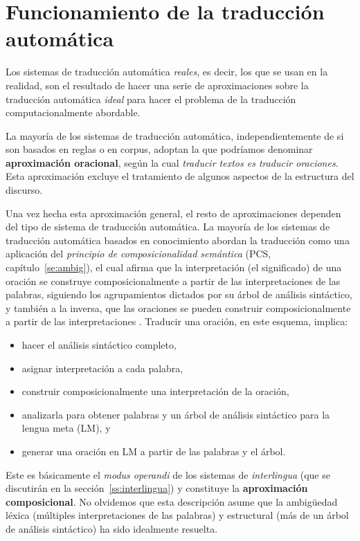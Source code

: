 \section{Funcionamiento de la traducción automática} \label{se:aprox} 

Los sistemas de traducción automática \emph{reales}, es decir, los que se usan en la realidad, son el resultado de hacer una serie de aproximaciones sobre la traducción automática \emph{ideal} para hacer el problema de la traducción computacionalmente abordable. 

La mayoría de los sistemas de traducción automática, independientemente de si son basados en reglas o en corpus, adoptan la que podríamos denominar \textbf{aproximación oracional}, según la cual \emph{traducir textos es traducir oraciones}. Esta aproximación excluye el tratamiento de algunos aspectos de la estructura del discurso. 

Una vez hecha esta aproximación general, el resto de aproximaciones dependen del tipo de sistema de traducción automática. La mayoría de los sistemas de traducción automática basados en conocimiento abordan la traducción como una aplicación del \emph{principio de composicionalidad semántica} (PCS, capítulo~\ref{se:ambig}), el cual afirma que la interpretación (el significado) de una oración se construye composicionalmente a partir de las interpretaciones de las palabras, siguiendo los agrupamientos dictados por su árbol de análisis sintáctico, y también a la inversa, que las oraciones se pueden construir composicionalmente a partir de las interpretaciones \citep{tellier00p}. Traducir una oración, en este esquema, implica: \begin{itemize} \item hacer el análisis sintáctico completo, \item asignar interpretación a cada palabra, \item construir composicionalmente una interpretación de la oración, \item analizarla para obtener palabras y un árbol de análisis sintáctico para la lengua meta (LM), y \item generar una oración en LM a partir de las palabras y el árbol. \end{itemize} Este es básicamente el \emph{modus operandi} de los sistemas de \emph{interlingua} (que se discutirán en la sección~\ref{ss:interlingua}) y constituye la \textbf{aproximación composicional}. No olvidemos que esta descripción asume que la ambigüedad léxica (múltiples interpretaciones de las palabras) y estructural (más de un árbol de análisis sintáctico) ha sido idealmente resuelta. 

